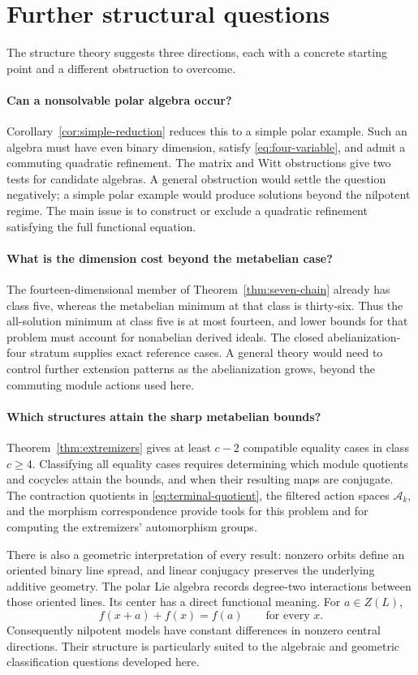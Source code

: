 \section{Further structural questions}
\label{sec:questions}

The structure theory suggests three directions, each with a concrete
starting point and a different obstruction to overcome.

\paragraph{Can a nonsolvable polar algebra occur?}
Corollary~\ref{cor:simple-reduction} reduces this to a simple polar
example. Such an algebra must have even binary dimension, satisfy
\eqref{eq:four-variable}, and admit a commuting quadratic refinement.
The matrix and Witt obstructions give two tests for candidate algebras.
A general obstruction would settle the question negatively; a simple
polar example would produce solutions beyond the nilpotent regime.
The main issue is to construct or exclude a quadratic refinement
satisfying the full functional equation.

\paragraph{What is the dimension cost beyond the metabelian case?}
The fourteen-dimensional member of
Theorem~\ref{thm:seven-chain} already has class five, whereas the
metabelian minimum at that class is thirty-six. Thus the all-solution
minimum at class five is at most fourteen, and lower bounds for that
problem must account for nonabelian derived ideals. The closed
abelianization-four stratum supplies exact reference cases. A general
theory would need to control further extension patterns as the
abelianization grows, beyond the commuting module actions used here.

\paragraph{Which structures attain the sharp metabelian bounds?}
Theorem~\ref{thm:extremizers} gives at least \(c-2\) compatible equality
cases in class \(c\ge4\). Classifying all equality cases requires
determining which module quotients and cocycles attain the bounds,
and when their resulting maps are conjugate. The contraction quotients
in \eqref{eq:terminal-quotient}, the filtered action spaces
\(\mathcal A_k\), and the morphism correspondence provide tools for
this problem and for computing the extremizers' automorphism groups.

There is also a geometric interpretation of every result: nonzero
orbits define an oriented binary line spread, and linear conjugacy
preserves the underlying additive geometry. The polar Lie algebra
records degree-two interactions between those oriented lines.
Its center has a direct functional meaning. For \(a\in Z(L)\),
\[
 f(x+a)+f(x)=f(a)\qquad\text{for every }x.
\]
Consequently nilpotent models have constant differences in nonzero
central directions. Their structure is particularly suited to the
algebraic and geometric classification questions developed here.
